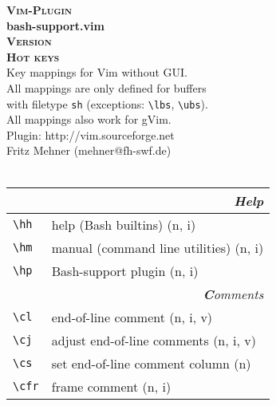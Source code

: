 \documentclass[oneside,12pt,a4paper,DIV18]{scrartcl}
\begin{document}
\begin{center}
\textbf{\textsc{\small{Vim-Plugin}}}\\
\textbf{\large{bash-support.vim}}\\
\textbf{\textsc{\small{Version \PluginVersion}}}\\
\vspace{6mm}%
\textbf{\textsc{\huge{Hot keys}}}\\ 
\vspace{6mm}%
\footnotesize{Key mappings for Vim without GUI.}\\
\vspace{1mm}%
\footnotesize{
All mappings are only defined for buffers\\
with filetype \texttt{sh} (exceptions: \verb'\lbs',  \verb'\ubs').\\
All mappings also work for gVim.}\\ 
\vspace{1mm}%
\footnotesize{Plugin: http://vim.sourceforge.net}\\
\footnotesize{Fritz Mehner (mehner@fh-swf.de)}\\
\footnotesize{\ReleaseDate}\\
\vspace{6.5mm}
\small
\begin{tabular}[]{|p{11mm}|p{59mm}|}
\hline 
\multicolumn{2}{|r|}{\textsl{\textbf{H}elp}} \\
\hline \verb'\hh'  & help (Bash builtins)             \hfill (n, i) \\
\hline \verb'\hm'  & manual (command line utilities) \hfill (n, i) \\
\hline \verb'\hp'  & Bash-support plugin              \hfill (n, i) \\
\hline
\hline 
\hline
\multicolumn{2}{|r|}{\textsl{\textbf{C}omments}} \\
\hline \verb'\cl'  & end-of-line comment              \hfill (n, i, v) \\
\hline \verb'\cj'  & adjust end-of-line comments      \hfill (n, i, v) \\
\hline \verb'\cs'  & set end-of-line comment column   \hfill (n) \\
\hline \verb'\cfr' & frame comment                    \hfill (n, i) \\

\end{tabular}
\end{center}
\end{document}
